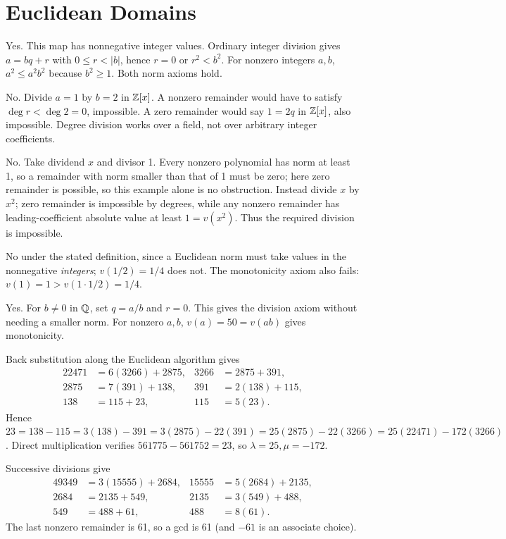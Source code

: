 \section{Euclidean Domains}

Yes. This map has nonnegative integer values. Ordinary integer division gives $a=bq+r$ with $0\le r<|b|$, hence $r=0$ or $r^2<b^2$. For nonzero integers $a,b$, $a^2\le a^2b^2$ because $b^2\ge1$. Both norm axioms hold.

No. Divide $a=1$ by $b=2$ in $\mathbb{Z}[x]$. A nonzero remainder would have to satisfy $\deg r<\deg2=0$, impossible. A zero remainder would say $1=2q$ in $\mathbb{Z}[x]$, also impossible. Degree division works over a field, not over arbitrary integer coefficients.

No. Take dividend $x$ and divisor 1. Every nonzero polynomial has norm at least 1, so a remainder with norm smaller than that of 1 must be zero; here zero remainder is possible, so this example alone is no obstruction. Instead divide $x$ by $x^2$; zero remainder is impossible by degrees, while any nonzero remainder has leading-coefficient absolute value at least $1=v(x^2)$. Thus the required division is impossible.

No under the stated definition, since a Euclidean norm must take values in the nonnegative \emph{integers}; $v(1/2)=1/4$ does not. The monotonicity axiom also fails: $v(1)=1>v(1\cdot1/2)=1/4$.

Yes. For $b\ne0$ in $\mathbb{Q}$, set $q=a/b$ and $r=0$. This gives the division axiom without needing a smaller norm. For nonzero $a,b$, $v(a)=50=v(ab)$ gives monotonicity.

Back substitution along the Euclidean algorithm gives
\begin{align*}
22471&=6(3266)+2875,&3266&=2875+391,\\
2875&=7(391)+138,&391&=2(138)+115,\\
138&=115+23,&115&=5(23).
\end{align*}
Hence $23=138-115=3(138)-391=3(2875)-22(391)
=25(2875)-22(3266)=25(22471)-172(3266)$. Direct multiplication verifies $561775-561752=23$, so $\lambda=25,\mu=-172$.

Successive divisions give
\begin{align*}
49349&=3(15555)+2684,&15555&=5(2684)+2135,\\
2684&=2135+549,&2135&=3(549)+488,\\
549&=488+61,&488&=8(61).
\end{align*}
The last nonzero remainder is 61, so a gcd is 61 (and $-61$ is an associate choice).

